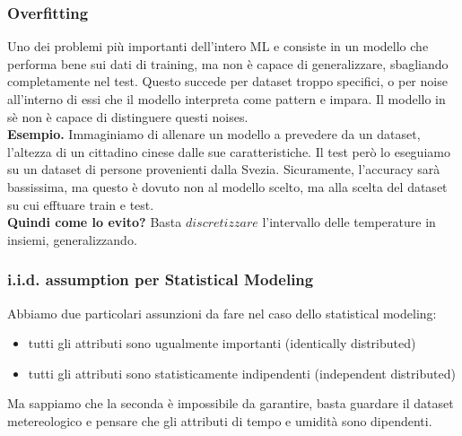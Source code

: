 \subsubsection{Overfitting}
Uno dei problemi più importanti dell'intero ML e consiste in un modello che performa bene sui dati di training, ma non è capace di generalizzare, sbagliando completamente nel test. Questo succede per dataset troppo specifici, o per noise all'interno di essi che il modello interpreta come pattern e impara. Il modello in sè non è capace di distinguere questi noises. 
\\
\textbf{Esempio.} Immaginiamo di allenare un modello a prevedere da un dataset, l'altezza di un cittadino cinese dalle sue caratteristiche. Il test però lo eseguiamo su un dataset di persone provenienti dalla Svezia. Sicuramente, l'accuracy sarà bassissima, ma questo è dovuto non al modello scelto, ma alla scelta del dataset su cui efftuare train e test.
\\
\textbf{Quindi come lo evito?} Basta $discretizzare$ l'intervallo delle temperature in insiemi, generalizzando.

\subsubsection{i.i.d. assumption per Statistical Modeling}
Abbiamo due particolari assunzioni da fare nel caso dello statistical modeling:
\begin{itemize}
    \item tutti gli attributi sono ugualmente importanti (identically distributed)
    \item tutti gli attributi sono statisticamente indipendenti (independent distributed)
\end{itemize}
Ma sappiamo che la seconda è impossibile da garantire, basta guardare il dataset metereologico e pensare che gli attributi di tempo e umidità sono dipendenti.

\newpage

